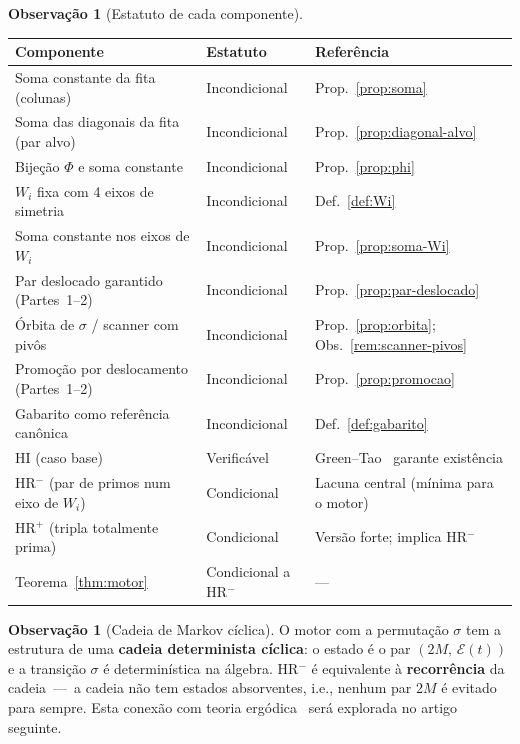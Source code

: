 \documentclass[12pt, a4paper]{article}
\theoremstyle{plain}
\theoremstyle{definition}
\newtheorem{remark}[theorem]{Observação}
\theoremstyle{remark}
\begin{document}
	\begin{remark}[Estatuto de cada componente]
		\label{rem:estatuto}
		\begin{center}
			\begin{tabular}{p{5.5cm}ll}
				\toprule
				Componente & Estatuto & Referência \\
				\midrule
				Soma constante da fita (colunas) &
				Incondicional &
				Prop.~\ref{prop:soma} \\
				Soma das diagonais da fita (par alvo) &
				Incondicional &
				Prop.~\ref{prop:diagonal-alvo} \\
				Bijeção $\Phi$ e soma constante &
				Incondicional &
				Prop.~\ref{prop:phi} \\
				$W_i$ fixa com 4 eixos de simetria &
				Incondicional &
				Def.~\ref{def:Wi} \\
				Soma constante nos eixos de $W_i$ &
				Incondicional &
				Prop.~\ref{prop:soma-Wi} \\
				Par deslocado garantido (Partes~1--2) &
				Incondicional &
				Prop.~\ref{prop:par-deslocado} \\
				Órbita de $\sigma$ / scanner com pivôs &
				Incondicional &
				Prop.~\ref{prop:orbita}; Obs.~\ref{rem:scanner-pivos} \\
				Promoção por deslocamento (Partes~1--2) &
				Incondicional &
				Prop.~\ref{prop:promocao} \\
				Gabarito como referência canônica &
				Incondicional &
				Def.~\ref{def:gabarito} \\
				HI (caso base) &
				Verificável &
				Green--Tao~\cite{green-tao} garante existência \\
				HR$^-$ (par de primos num eixo de $W_i$) &
				Condicional &
				Lacuna central (mínima para o motor) \\
				HR$^+$ (tripla totalmente prima) &
				Condicional &
				Versão forte; implica HR$^-$ \\
				Teorema~\ref{thm:motor} &
				Condicional a HR$^-$ & --- \\
				\bottomrule
			\end{tabular}
		\end{center}
	\end{remark}
	
	\begin{remark}[Cadeia de Markov cíclica]
		O motor com a permutação $\sigma$ tem a estrutura de uma
		\textbf{cadeia determinista cíclica}: o estado é o par
		$(2M,\,\mathcal{E}(t))$ e a transição $\sigma$ é determinística
		na álgebra.  HR$^-$ é equivalente à \textbf{recorrência} da
		cadeia~---~a cadeia não tem estados absorventes, i.e., nenhum
		par $2M$ é evitado para sempre.  Esta conexão com teoria
		ergódica~\cite{grade} será explorada no artigo seguinte.
	\end{remark}
	
\end{document}
